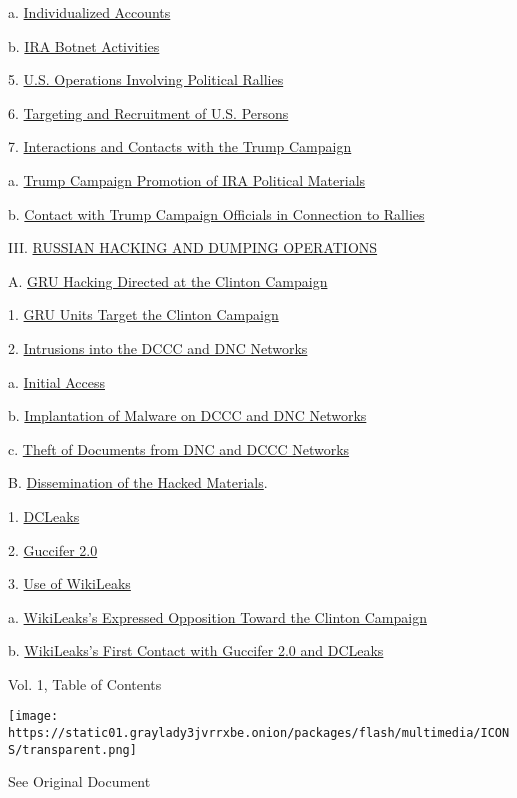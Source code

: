 a. \protect\hyperlink{g-page-34}{Individualized Accounts}

b. \protect\hyperlink{g-page-36}{IRA Botnet Activities}

5. \protect\hyperlink{g-page-37}{U.S. Operations Involving Political
Rallies}

6. \protect\hyperlink{g-page-39}{Targeting and Recruitment of U.S.
Persons}

7. \protect\hyperlink{g-page-41}{Interactions and Contacts with the
Trump Campaign}

a. \protect\hyperlink{g-page-41}{Trump Campaign Promotion of IRA
Political Materials}

b. \protect\hyperlink{g-page-43}{Contact with Trump Campaign Officials
in Connection to Rallies}

III. \protect\hyperlink{g-page-44}{RUSSIAN HACKING AND DUMPING
OPERATIONS}

A. \protect\hyperlink{g-page-44}{GRU Hacking Directed at the Clinton
Campaign}

1. \protect\hyperlink{g-page-44}{GRU Units Target the Clinton Campaign}

2. \protect\hyperlink{g-page-45}{Intrusions into the DCCC and DNC
Networks}

a. \protect\hyperlink{g-page-46}{Initial Access}

b. \protect\hyperlink{g-page-46}{Implantation of Malware on DCCC and DNC
Networks}

c. \protect\hyperlink{g-page-48}{Theft of Documents from DNC and DCCC
Networks}

B. \protect\hyperlink{g-page-49}{Dissemination of the Hacked Materials}.

1. \protect\hyperlink{g-page-49}{DCLeaks}

2. \protect\hyperlink{g-page-50}{Guccifer 2.0}

3. \protect\hyperlink{g-page-52}{Use of WikiLeaks}

a. \protect\hyperlink{g-page-52}{WikiLeaks's Expressed Opposition Toward
the Clinton Campaign}

b. \protect\hyperlink{g-page-53}{WikiLeaks's First Contact with Guccifer
2.0 and DCLeaks}

Vol. 1, Table of Contents

\protect\hyperlink{}{}

\texttt{[image: https://static01.graylady3jvrrxbe.onion/packages/flash/multimedia/ICONS/transparent.png]}

See Original Document

